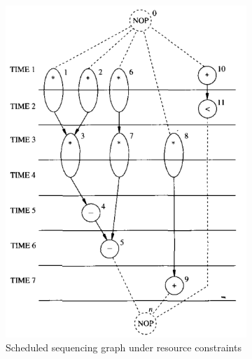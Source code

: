 \begin{figure}[H]
\begin{subfigure}[b]{0.35\textwidth}
        \includegraphics[width=\textwidth]{./Cap4/Images/Image12.png}
        \caption{Scheduled sequencing graph under resource constraints}
   		\label{fig:ListLabelSch}
    \end{subfigure}
    \caption{}
\end{figure}
